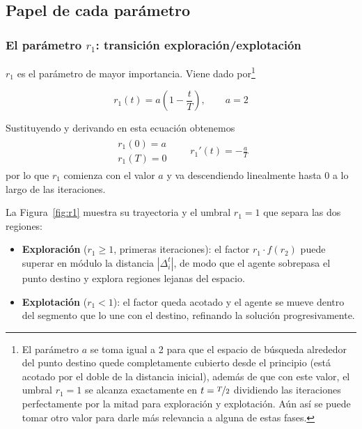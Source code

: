 \documentclass[12pt,a4paper]{article}
\begin{document}
\subsection{Papel de cada parámetro}

\subsubsection{El parámetro $r_1$: transición exploración/explotación}

$r_1$ es el parámetro de mayor importancia. Viene dado por\footnote{El parámetro $a$ se toma igual a 2 para que el espacio de búsqueda alrededor del punto destino quede completamente cubierto desde el principio (está acotado por el doble de la distancia inicial), además de que con este valor, el umbral $r_1=1$ se alcanza exactamente en $t=\nicefrac{T}{2}$ dividiendo las iteraciones perfectamente por la mitad para exploración y explotación. Aún así se puede tomar otro valor para darle más relevancia a alguna de estas fases.}

\begin{equation}
r_1(t) = a \left(1 - \frac{t}{T}\right), \qquad a = 2
\label{eq:r1}
\end{equation}

Sustituyendo y derivando en esta ecuación obtenemos
\begin{gather*}
  \begin{array}{c}
    r_1(0)=a\\[0.8em]
    r_1(T)=0
  \end{array} \qquad
  r_1'(t) = - \frac{a}{T}
\end{gather*}
por lo que $r_1$ comienza con el valor $a$ y va descendiendo linealmente hasta $0$ a lo largo de las iteraciones.

La Figura~\ref{fig:r1} muestra su trayectoria y el umbral $r_1 = 1$ que separa las dos regiones:

\begin{itemize}
  \item \textbf{Exploración} ($r_1 \geq 1$, primeras iteraciones): el factor $r_1 \cdot f(r_2)$ puede superar en módulo la distancia $|\Delta_i^t|$, de modo que el agente sobrepasa el punto destino y explora regiones lejanas del espacio.
  \item \textbf{Explotación} ($r_1 < 1$): el factor queda acotado y el agente se mueve dentro del segmento que lo une con el destino, refinando la solución progresivamente.
\end{itemize}
\end{document}
